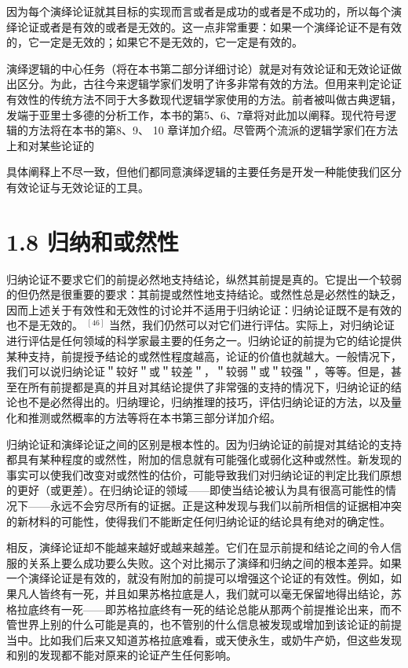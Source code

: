 因为每个演绎论证就其目标的实现而言或者是成功的或者是不成功的，所以每个演绎论证或者是有效的或者是无效的。这一点非常重要：如果一个演绎论证不是有效的，它一定是无效的；如果它不是无效的，它一定是有效的。

演绎逻辑的中心任务（将在本书第二部分详细讨论）就是对有效论证和无效论证做出区分。为此，古往今来逻辑学家们发明了许多非常有效的方法。但用来判定论证有效性的传统方法不同于大多数现代逻辑学家使用的方法。前者被叫做古典逻辑，发端于亚里士多德的分析工作，本书的第5、6、7章将对此加以阐释。现代符号逻辑的方法将在本书的第8、9、 10 章详加介绍。尽管两个流派的逻辑学家们在方法上和对某些论证的

具体阐释上不尽一致，但他们都同意演绎逻辑的主要任务是开发一种能使我们区分有效论证与无效论证的工具。

\section*{1.8 归纳和或然性}
归纳论证不要求它们的前提必然地支持结论，纵然其前提是真的。它提出一个较弱的但仍然是很重要的要求：其前提或然性地支持结论。或然性总是必然性的缺乏，因而上述关于有效性和无效性的讨论并不适用于归纳论证：归纳论证既不是有效的也不是无效的。 ${ }^{[46]}$ 当然，我们仍然可以对它们进行评估。实际上，对归纳论证进行评估是任何领域的科学家最主要的任务之一。归纳论证的前提为它的结论提供某种支持，前提授予结论的或然性程度越高，论证的价值也就越大。一般情况下，我们可以说归纳论证＂较好＂或＂较差＂，＂较弱＂或＂较强＂，等等。但是，甚至在所有前提都是真的并且对其结论提供了非常强的支持的情况下，归纳论证的结论也不是必然得出的。归纳理论，归纳推理的技巧，评估归纳论证的方法，以及量化和推测或然概率的方法等将在本书第三部分详加介绍。

归纳论证和演绎论证之间的区别是根本性的。因为归纳论证的前提对其结论的支持都具有某种程度的或然性，附加的信息就有可能强化或弱化这种或然性。新发现的事实可以使我们改变对或然性的估价，可能导致我们对归纳论证的判定比我们原想的更好（或更差）。在归纳论证的领域——即使当结论被认为具有很高可能性的情况下——永远不会穷尽所有的证据。正是这种发现与我们以前所相信的证据相冲突的新材料的可能性，使得我们不能断定任何归纳论证的结论具有绝对的确定性。

相反，演绎论证却不能越来越好或越来越差。它们在显示前提和结论之间的令人信服的关系上要么成功要么失败。这个对比揭示了演绎和归纳之间的根本差异。如果一个演绎论证是有效的，就没有附加的前提可以增强这个论证的有效性。例如，如果凡人皆终有一死，并且如果苏格拉底是人，我们就可以毫无保留地得出结论，苏格拉底终有一死——即苏格拉底终有一死的结论总能从那两个前提推论出来，而不管世界上别的什么可能是真的，也不管别的什么信息被发现或增加到该论证的前提当中。比如我们后来又知道苏格拉底难看，或天使永生，或奶牛产奶，但这些发现和别的发现都不能对原来的论证产生任何影响。

